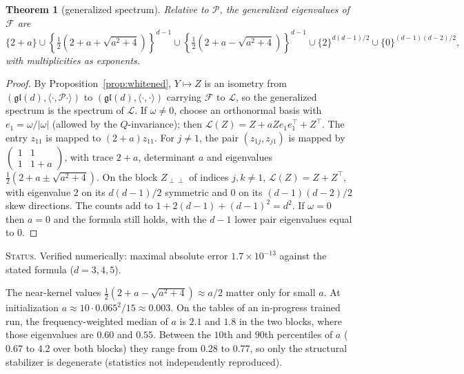 \documentclass[11pt]{article}
\newtheorem{theorem}{Theorem}[section]
\theoremstyle{definition}
\theoremstyle{remark}
\newcommand{\gl}{\mathfrak{gl}}
\newcommand{\ip}[2]{\langle #1, #2\rangle}
\newcommand{\status}[1]{\par\smallskip\noindent\textsc{Status.} #1\par\smallskip}
\begin{document}
\begin{theorem}[generalized spectrum]\label{thm:spectrum}
Relative to $\mathcal{P}$, the generalized eigenvalues of $\mathcal{F}$ are
\begin{equation}\label{eq:spectrum}
\{2+a\}\cup\left\{\tfrac12\left(2+a+\sqrt{a^2+4}\right)\right\}^{d-1}\cup\left\{\tfrac12\left(2+a-\sqrt{a^2+4}\right)\right\}^{d-1}\cup\{2\}^{d(d-1)/2}\cup\{0\}^{(d-1)(d-2)/2},
\end{equation}
with multiplicities as exponents.
\end{theorem}
\begin{proof}
By Proposition~\ref{prop:whitened}, $Y\mapsto Z$ is an isometry from $(\gl(d),\ip{\cdot}{\mathcal{P}\cdot})$ to $(\gl(d),\ip{\cdot}{\cdot})$ carrying $\mathcal{F}$ to $\mathcal{L}$, so the generalized spectrum is the spectrum of $\mathcal{L}$. If $\omega\neq0$, choose an orthonormal basis with $e_1=\omega/|\omega|$ (allowed by the $Q$-invariance); then $\mathcal{L}(Z)=Z+aZe_1e_1^\top+Z^\top$. The entry $z_{11}$ is mapped to $(2+a)z_{11}$. For $j\neq1$, the pair $(z_{1j},z_{j1})$ is mapped by $\begin{pmatrix}1&1\\1&1+a\end{pmatrix}$, with trace $2+a$, determinant $a$ and eigenvalues $\frac12(2+a\pm\sqrt{a^2+4})$. On the block $Z_{\perp\perp}$ of indices $j,k\neq1$, $\mathcal{L}(Z)=Z+Z^\top$, with eigenvalue $2$ on its $d(d-1)/2$ symmetric and $0$ on its $(d-1)(d-2)/2$ skew directions. The counts add to $1+2(d-1)+(d-1)^2=d^2$. If $\omega=0$ then $a=0$ and the formula still holds, with the $d-1$ lower pair eigenvalues equal to $0$.
\end{proof}
\status{Verified numerically: maximal absolute error $1.7\times10^{-13}$ against the stated formula ($d=3,4,5$).}

The near-kernel values $\frac12(2+a-\sqrt{a^2+4})\approx a/2$ matter only for small $a$. At initialization $a\approx10\cdot0.065^2/15\approx0.003$. On the tables of an in-progress trained run, the frequency-weighted median of $a$ is $2.1$ and $1.8$ in the two blocks, where those eigenvalues are $0.60$ and $0.55$. Between the $10$th and $90$th percentiles of $a$ ($0.67$ to $4.2$ over both blocks) they range from $0.28$ to $0.77$, so only the structural stabilizer is degenerate (statistics not independently reproduced).
\end{document}
